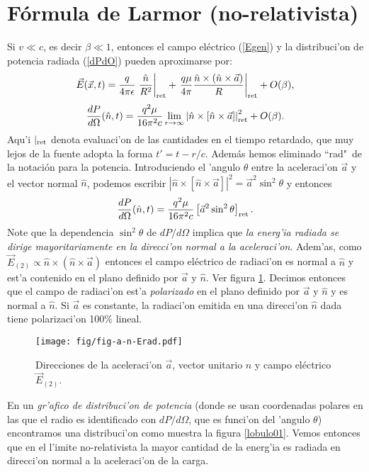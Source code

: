 \section{Fórmula de Larmor (no-relativista)}\label{sec:Larmor-norel}

Si $v\ll c$, es decir $\beta\ll1$, entonces el campo eléctrico
(\ref{Egen}) y la distribuci'on de potencia radiada (\ref{dPdO}) pueden
aproximarse por:
\begin{equation}
\vec{E}(\vec{x},t)=\frac{q}{4\pi\epsilon}\left.\frac{\hat{n}}{R^2}\right|_{\rm ret}+\left.
\frac{q\mu}{4\pi}\frac{\hat{n}\times(\hat{n}\times{\vec{a}})}{R}\right|_{\rm
ret} +O(\beta),
\end{equation}
\begin{equation}
\frac{dP}{d\Omega}(\hat{n},t)=\frac{q^2\mu}{16\pi^2c}\lim_{r\rightarrow\infty}
\left|\hat{n}\times\left[
\hat{n}\times{\vec{a}}\right]\right|^2_{\rm ret}  +O(\beta).
\end{equation}
Aqu'i $|_{\rm ret}$ denota evaluaci'on de las cantidades en el tiempo retardado, que muy lejos de la fuente adopta la forma $t'=t-r/c$. Además hemos eliminado ``rad"\, de la notación para la potencia.
Introduciendo el 'angulo $\theta$ entre la aceleraci'on $\vec{a}$ y el vector
normal $\hat{n}$, podemos escribir
$\left|\hat{n}\times\left[\hat{n}\times{\vec{a}}\right]\right|^2=\vec{a}^2\sin^2\theta$ y entonces
\begin{equation}
\frac{dP}{d\Omega}(\hat{n},t)=\frac{q^2\mu}{16\pi^2 c}\left[ \vec{a}^2\sin^2\theta\right]_{\rm
ret} .\label{Lardif}
\end{equation}
 Note que la dependencia $\sin^2\theta$ de ${dP}/{d\Omega}$ implica que \textit{la energ'ia radiada se dirige mayoritariamente en la direcci'on normal a la aceleraci'on}. Adem'as, como $\vec{E}_{(2)}\propto \hat{n}\times(\hat{n}\times{\vec{a}})$ entonces el campo eléctrico de radiaci'on  es normal a $\hat{n}$ y est'a contenido en el plano definido por $\vec{a}$ y $\hat{n}$. Ver figura \ref{fig:natheta}. Decimos entonces que el campo de radiaci'on est'a
\textit{polarizado} en el plano definido por $\vec{a}$ y $\hat{n}$ y es normal a $\hat{n}$. Si $\vec{a}$ es constante, la radiaci'on emitida en una direcci'on $\hat{n}$ dada tiene polarizaci'on 100\% lineal.
\begin{figure}[!h]
\centerline{\texttt{[image: fig/fig-a-n-Erad.pdf]}}
\caption{Direcciones de la aceleraci'on $\vec{a}$, vector unitario $\hat{n}$ y campo eléctrico $\vec{E}_{(2)}$.}
\label{fig:natheta}
\end{figure}
En un \textit{gr'afico de distribuci'on de potencia} (donde se usan coordenadas polares en las que el radio es identificado con ${dP}/{d\Omega}$, que es funci'on del 'angulo $\theta$) encontramos una distribuci'on como muestra la figura \ref{lobulo01}. Vemos entonces que en el l'imite no-relativista la mayor cantidad de la energ'ia es radiada en direcci'on normal a la aceleraci'on de la carga.

